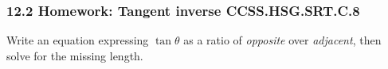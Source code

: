 

\fancyhead[LE]{\thepage}



\subsubsection*{12.2 Homework: Tangent inverse \hfill CCSS.HSG.SRT.C.8}
Write an equation expressing $\tan \theta$ as a ratio of \emph{opposite} over \emph{adjacent}, then solve for the missing length.
